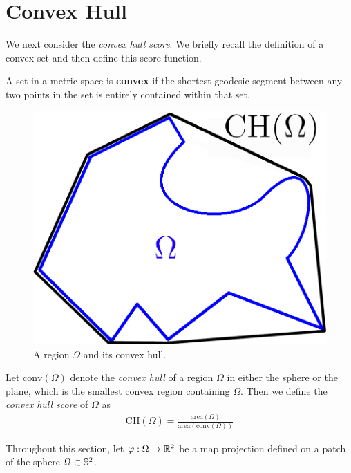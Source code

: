 \section{Convex Hull}\label{sec:ch}
We next consider the \textit{convex hull
score}.  We briefly recall the definition of a convex set and then
define this score function.


\begin{definition}
	A set in a metric space is \textbf{convex} if the shortest geodesic segment between any two points in the set is entirely 
	contained within that set.
\end{definition}



\begin{figure}[h]
	\centering
	\includegraphics[width=.5\textwidth]{figs/ch_example.png}
	\caption{A region $\Omega$ and its convex hull.}
	\label{fig:ch_example}
\end{figure}

\begin{definition}
  Let $\mathrm{conv}(\Omega)$ denote the \textit{convex hull} of
  a region $\Omega$ in either the sphere or the plane, which is the
  smallest convex region containing $\Omega$.  Then we define the
  \textit{convex hull score} of $\Omega$ as 
  \begin{align*}
    \mathrm{CH}(\Omega)=
    \frac{\mathrm{area}(\Omega)}{\mathrm{area}(\mathrm{conv}(\Omega))}
  \end{align*}
\end{definition}



Throughout this section, let $\varphi:\Omega \to \mathbb{R}^2$ be a 
map projection defined on a patch of the sphere $\Omega\subset \mathbb{S}^2$.


